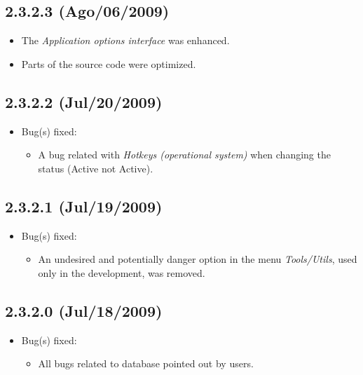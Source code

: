 \subsection{2.3.2.3 (Ago/06/2009)}

\begin{itemize}
  \item The \textit{Application options interface} was enhanced.
  \item Parts of the source code were optimized.
\end{itemize}


\subsection{2.3.2.2 (Jul/20/2009)}

\begin{itemize}
  \item Bug(s) fixed:
    \begin{itemize}
      \item A bug related with \textit{Hotkeys (operational system)} when
        changing the status (Active not Active).
    \end{itemize}
\end{itemize}


\subsection{2.3.2.1 (Jul/19/2009)}

\begin{itemize}
  \item Bug(s) fixed:
    \begin{itemize}
      \item An undesired and potentially danger option in the menu
        \textit{Tools/Utils}, used only in the development, was removed.
    \end{itemize}
\end{itemize}


\subsection{2.3.2.0 (Jul/18/2009)}

\begin{itemize}
  \item Bug(s) fixed:
    \begin{itemize}
      \item All bugs related to database pointed out by users.
    \end{itemize}
\end{itemize}


